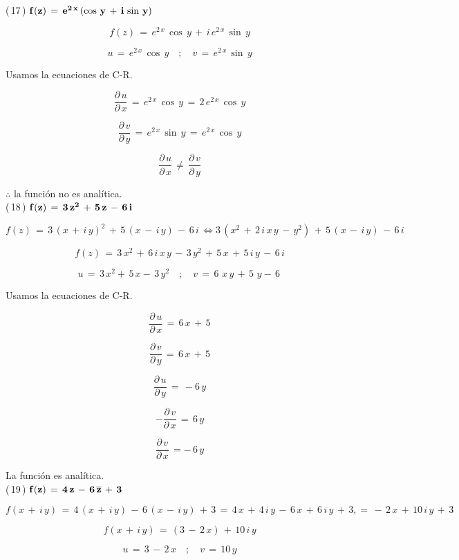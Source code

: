 \documentclass[a4paper,11pt,openany]{book}
\begin{document}
\textcolor{ao(english)}{(\,17\,)} $\bf{f(z)\,=\,e^{2\,x}\,(\cos\,y\,+\,i\,\sin\,y)}$

$$f(z)\,=\,e^{2\,x}\,\cos\,y\,+\,i\,e^{2\,x}\,\sin\,y$$

$$u\,=\,e^{2\,x}\,\cos\,y \quad;\quad v\,=\,e^{2\,x}\,\sin\,y$$

\textcolor{ao(english)}{} Usamos la ecuaciones de C-R.

$$\dfrac{\partial\,u}{\partial\,x}\,=\,e^{2\,x}\,\cos\,y\,=\,2\,e^{2\,x}\,\cos\,y$$

$$\dfrac{\partial\,v}{\partial\,y}\,=\,e^{2\,x}\,\sin\,y\,=\,e^{2\,x}\,\cos\,y$$

$$\dfrac{\partial\,u}{\partial\,x}\,\neq\,\dfrac{\partial\,v}{\partial\,y}$$

$\therefore$ la función no es analítica.\\

\textcolor{ao(english)}{(\,18\,)} $\bf{f(z)\,=\,3\,z^{2}\,+\,5\,z\,-\,6\,i}$

$$f(z)\,=\,3\,(x\,+\,i\,y)^{2}\,+\,5\,(x\,-\,i\,y)\,-\,6\,i\,\iff 3\,(x^{2}\,+\,2\,i\,x\,y\,-\,y^{2})\,+\,5\,(x\,-\,i\,y)\,-\,6\,i\, $$  

$$f(z)\,= \,3\,x^{2}\,+\,6\,i\,x\,y\,-\,3\,y^{2}\,+\,5\,x\,+\,5\,i\,y\,-\,6\,i$$

$$u\,=\,3\,x^{2}+\,5\,x-\,3\,y^{2} \quad;\quad v\,=\,6\,\,x\,y\,+\,5\,\,y-\,6\,$$

\textcolor{ao(english)}{} Usamos la ecuaciones de C-R.

$$\dfrac{\partial\,u}{\partial\,x}\,=\,6\,x\,+\,5$$

$$\dfrac{\partial\,v}{\partial\,y}\,=\,6\,x\,+\,5$$

$$\dfrac{\partial\,u}{\partial\,y}\,=\,-6\,y$$

$$-\dfrac{\partial\,v}{\partial\,x}\,=\,6\,y$$

$$\dfrac{\partial\,v}{\partial\,x}\,=-\,6\,y$$

La función es analítica.\\

\textcolor{ao(english)}{(\,19\,)} $\bf{f(z)\,=\,4\,z\,-\,6\,\overline{z}\,+\,3}$

$$f(x\,+\,i\,y)\,=\,4\,(x\,+\,i\,y)\,-\,6\,(x\,-\,i\,y)\,+\,3\,=\,4\,x\,+\,4\,i\,y\,-\,6\,x\,+\,6\,i\,y\,+\,3,=\,-\,2\,x\,+\,10\,i\,y\,+\,3$$

$$f(x\,+\,i\,y)\,=\,(3\,-\,2\,x)\,+\,10\,i\,y$$

$$u\,=\,3\,-\,2\,x \quad;\quad v\,=\,10\,y$$
\end{document}
